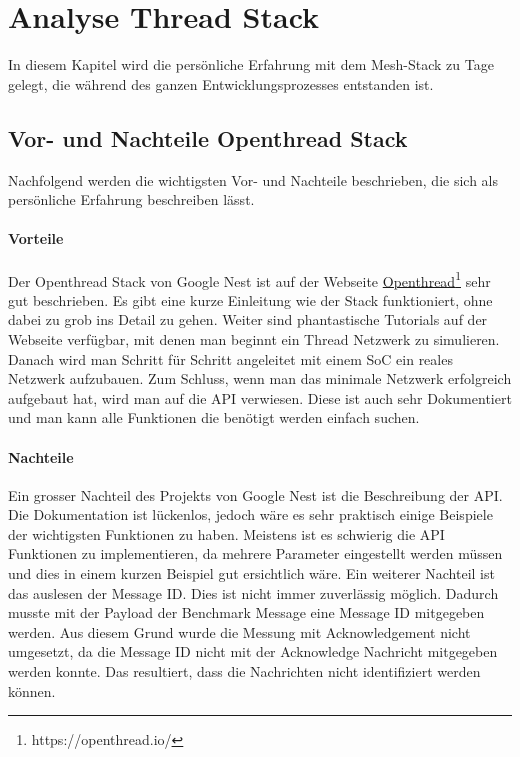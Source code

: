 \clearpage
\section{Analyse Thread Stack}\label{sec:AnalyseThreadStack}
In diesem Kapitel wird die persönliche Erfahrung mit dem Mesh-Stack zu Tage gelegt, die während des ganzen Entwicklungsprozesses entstanden ist.

\subsection{Vor- und Nachteile Openthread Stack}\label{susec:ThreadVorNachteile}
Nachfolgend werden die wichtigsten Vor- und Nachteile beschrieben, die sich als persönliche Erfahrung beschreiben lässt.
\paragraph{Vorteile}
Der Openthread Stack von Google Nest ist auf der Webseite \href{https://openthread.io/}{Openthread\footnote{\url{https://openthread.io/}}} sehr gut beschrieben. Es gibt eine kurze Einleitung wie der Stack funktioniert, ohne dabei zu grob ins Detail zu gehen. Weiter sind phantastische Tutorials auf der Webseite verfügbar, mit denen man beginnt ein Thread Netzwerk zu simulieren. Danach wird man Schritt für Schritt angeleitet mit einem SoC ein reales Netzwerk aufzubauen. Zum Schluss, wenn man das minimale Netzwerk erfolgreich aufgebaut hat, wird man auf die API verwiesen. Diese ist auch sehr Dokumentiert und man kann alle Funktionen die benötigt werden einfach suchen.

\paragraph{Nachteile}
Ein grosser Nachteil des Projekts von Google Nest ist die Beschreibung der API. Die Dokumentation ist lückenlos, jedoch wäre es sehr praktisch einige Beispiele der wichtigsten Funktionen zu haben. Meistens ist es schwierig die API Funktionen zu implementieren, da mehrere Parameter eingestellt werden müssen und dies in einem kurzen Beispiel gut ersichtlich wäre. Ein weiterer Nachteil ist das auslesen der Message ID. Dies ist nicht immer zuverlässig möglich. Dadurch musste mit der Payload der Benchmark Message eine Message ID mitgegeben werden. Aus diesem Grund wurde die Messung mit Acknowledgement nicht umgesetzt, da die Message ID nicht mit der Acknowledge Nachricht mitgegeben werden konnte. Das resultiert, dass die Nachrichten nicht identifiziert werden können.

